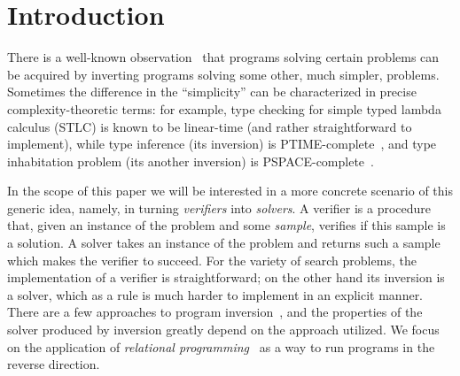 \section{Introduction}


There is a well-known observation~\cite{lozov2019relational,SemanticsModifiers1} that programs solving certain problems can be acquired by inverting programs solving some other, much simpler, problems.
Sometimes the difference in the ``simplicity'' can be characterized in precise complexity-theoretic terms: for example, type checking for simple typed lambda calculus (STLC) is known to be linear-time (and rather straightforward to implement), while type inference (its inversion) is PTIME-complete~\cite{mairson2004linear}, and type inhabitation problem (its another inversion) is PSPACE-complete~\cite{urzyczyn1997inhabitation}.

In the scope of this paper we will be interested in a more concrete scenario of this generic idea, namely, in turning \emph{verifiers} into \emph{solvers}.
A verifier is a procedure that, given an instance of the problem and some \emph{sample}, verifies if this sample is a solution.
A solver takes an instance of the problem and returns such a sample which makes the verifier to succeed.
For the variety of search problems, the implementation of a verifier is straightforward; on the other hand its inversion is a solver, which as a rule is much harder to implement in an explicit manner.
There are a few approaches to program inversion~\cite{RevURA,aman2020foundations}, and the properties of the solver produced by inversion greatly depend on the approach utilized.
We focus on the application of \emph{relational programming}~\cite{TheReasonedSchemer} as a way to run programs in the reverse direction.



